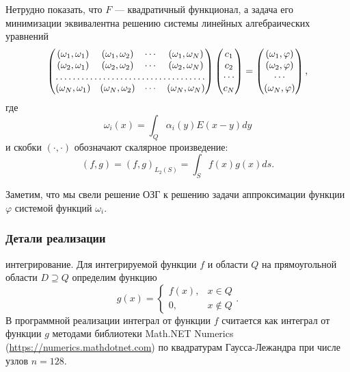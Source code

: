 \documentclass[a4paper]{article}
\newcommand{\V}[1]{\int_Q #1(y) E(x-y) dy}
\begin{document}
Нетрудно показать, что $F$ --- квадратичный функционал, а задача его минимизации эквивалентна решению системы линейных алгебраических уравнений
\begin{equation}
    \begin{pmatrix}
        (\omega_1, \omega_1) & (\omega_1, \omega_2) & \cdots & (\omega_1, \omega_N)\\
        (\omega_2, \omega_1) & (\omega_2, \omega_2) & \cdots & (\omega_2, \omega_N)\\
        \hdotsfor{4}\\
        (\omega_N, \omega_1) & (\omega_N, \omega_2) & \cdots & (\omega_N, \omega_N)\\
    \end{pmatrix}
    \begin{pmatrix}
        c_1\\
        c_2\\
        \cdots\\
        c_N\\
    \end{pmatrix}
    =
    \begin{pmatrix}
        (\omega_1,\varphi)\\
        (\omega_2,\varphi)\\
        \cdots\\
        (\omega_N,\varphi)\\
    \end{pmatrix},
    \label{gram}
\end{equation}
где 
\begin{equation}
    \omega_i(x)=\V{\alpha_i}
\end{equation}
и скобки $(\cdot,\cdot)$ обозначают скалярное произведение:
\begin{equation}
    (f,g)=(f,g)_{L_2(S)}=\int_S f(x)g(x) ds.
\end{equation}

Заметим, что мы свели решение ОЗГ к решению задачи аппроксимации функции $\varphi$ системой функций $\omega_i$. 

\subsubsection{Детали реализации}
{ интегрирование}. Для интегрируемой функции $f$ и области $Q$ на прямоугольной области $D \supseteq Q$ определим функцию
\begin{equation*}
  g(x)=
  \begin{cases}
    f(x), & x \in Q\\
    0, & x \not \in Q
  \end{cases}.
\end{equation*}
В программной реализации интеграл от функции $f$ считается как интеграл от функции $g$ методами библиотеки Math.NET Numerics (\url{https://numerics.mathdotnet.com})
по квадратурам Гаусса-Лежандра при числе узлов $n=128$.
\end{document}
